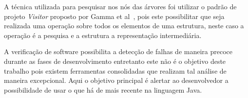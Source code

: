
A t\'{e}cnica utilizada para pesquisar nos n\'{o}s das \'{a}rvores foi utilizar o padr\~{a}o de projeto \textit{Visitor} proposto por  Gamma et al~\cite{Gamma:1995}, pois este possibilitar que seja realizada uma opera\c{c}\~{a}o sobre todos os elementos de uma estrutura,  neste caso a opera\c{c}\~{a}o  \'{e} a pesquisa e a estrutura a representa\c{c}\~{a}o intermedi\'{a}ria.


A verifica\c{c}\~{a}o de software possibilita a detec\c{c}\~{a}o de falhas de maneira precoce durante as fases de desenvolvimento entretanto este n\~{a}o \'{e} o objetivo deste trabalho pois existem ferramentas consolidadas que realizam tal an\'{a}lise de maneira excepcional. Aqui o objetivo principal \'{e} alertar ao desenvolvedor a possibilidade de usar o que h\'{a} de mais recente na linguagem Java.






